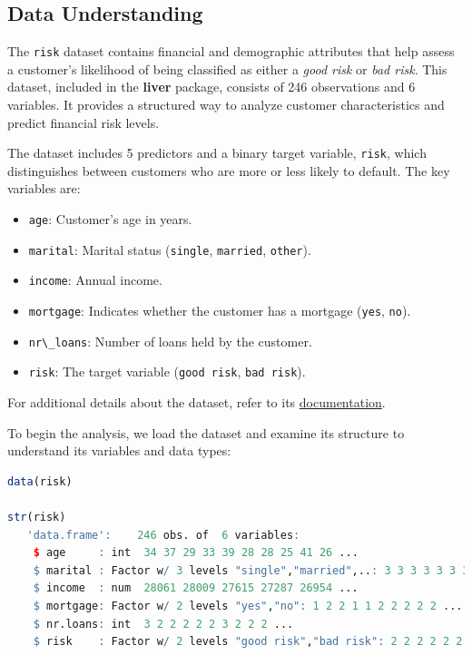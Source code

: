 \documentclass[
]{book}
\newcommand{\passthrough}[1]{#1}
\providecommand{\tightlist}{%
  \setlength{\itemsep}{0pt}\setlength{\parskip}{0pt}}
\theoremstyle{definition}
\theoremstyle{definition}
\theoremstyle{definition}
\theoremstyle{definition}
\theoremstyle{remark}
\begin{document}
\subsection*{Data Understanding}\label{data-understanding-1}

The \passthrough{\lstinline!risk!} dataset contains financial and demographic attributes that help assess a customer's likelihood of being classified as either a \emph{good risk} or \emph{bad risk}. This dataset, included in the \textbf{liver} package, consists of 246 observations and 6 variables. It provides a structured way to analyze customer characteristics and predict financial risk levels.

The dataset includes 5 predictors and a binary target variable, \passthrough{\lstinline!risk!}, which distinguishes between customers who are more or less likely to default. The key variables are:

\begin{itemize}
\tightlist
\item
  \passthrough{\lstinline!age!}: Customer's age in years.\\
\item
  \passthrough{\lstinline!marital!}: Marital status (\passthrough{\lstinline!single!}, \passthrough{\lstinline!married!}, \passthrough{\lstinline!other!}).\\
\item
  \passthrough{\lstinline!income!}: Annual income.\\
\item
  \passthrough{\lstinline!mortgage!}: Indicates whether the customer has a mortgage (\passthrough{\lstinline!yes!}, \passthrough{\lstinline!no!}).\\
\item
  \passthrough{\lstinline!nr\_loans!}: Number of loans held by the customer.\\
\item
  \passthrough{\lstinline!risk!}: The target variable (\passthrough{\lstinline!good risk!}, \passthrough{\lstinline!bad risk!}).
\end{itemize}

For additional details about the dataset, refer to its \href{https://search.r-project.org/CRAN/refmans/liver/html/risk.html}{documentation}.

To begin the analysis, we load the dataset and examine its structure to understand its variables and data types:

\begin{lstlisting}[language=R]
data(risk)

str(risk)
   'data.frame':    246 obs. of  6 variables:
    $ age     : int  34 37 29 33 39 28 28 25 41 26 ...
    $ marital : Factor w/ 3 levels "single","married",..: 3 3 3 3 3 3 3 3 3 3 ...
    $ income  : num  28061 28009 27615 27287 26954 ...
    $ mortgage: Factor w/ 2 levels "yes","no": 1 2 2 1 1 2 2 2 2 2 ...
    $ nr.loans: int  3 2 2 2 2 2 3 2 2 2 ...
    $ risk    : Factor w/ 2 levels "good risk","bad risk": 2 2 2 2 2 2 2 2 2 2 ...
\end{lstlisting}
\end{document}
